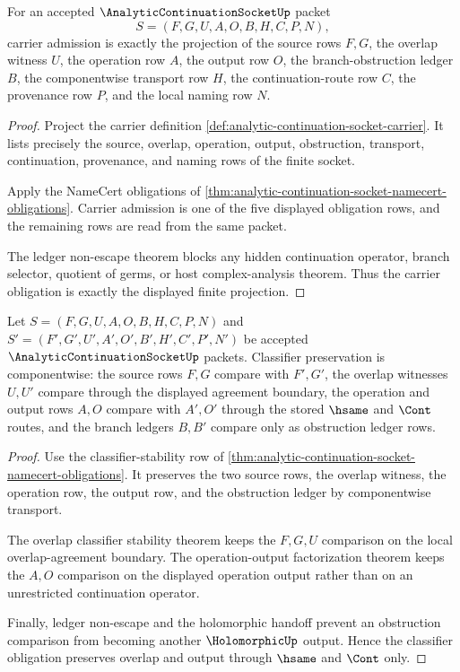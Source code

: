 \begin{theorem}
\label{thm:analytic-continuation-socket-carrier-obligation}
For an accepted $\AnalyticContinuationSocketUp$ packet
$$
S=(F,G,U,A,O,B,H,C,P,N),
$$
carrier admission is exactly the projection of the source rows $F,G$, the overlap witness $U$, the operation row $A$, the output row $O$, the branch-obstruction ledger $B$, the componentwise transport row $H$, the continuation-route row $C$, the provenance row $P$, and the local naming row $N$.
\end{theorem}
\begin{proof}
Project the carrier definition \autoref{def:analytic-continuation-socket-carrier}. It lists precisely the source, overlap, operation, output, obstruction, transport, continuation, provenance, and naming rows of the finite socket.

Apply the NameCert obligations of \autoref{thm:analytic-continuation-socket-namecert-obligations}. Carrier admission is one of the five displayed obligation rows, and the remaining rows are read from the same packet.

The ledger non-escape theorem blocks any hidden continuation operator, branch selector, quotient of germs, or host complex-analysis theorem. Thus the carrier obligation is exactly the displayed finite projection.
\end{proof}

\begin{theorem}
\label{thm:analytic-continuation-socket-classifier-obligation}
Let $S=(F,G,U,A,O,B,H,C,P,N)$ and $S'=(F',G',U',A',O',B',H',C',P',N')$ be accepted $\AnalyticContinuationSocketUp$ packets. Classifier preservation is componentwise: the source rows $F,G$ compare with $F',G'$, the overlap witnesses $U,U'$ compare through the displayed agreement boundary, the operation and output rows $A,O$ compare with $A',O'$ through the stored $\hsame$ and $\Cont$ routes, and the branch ledgers $B,B'$ compare only as obstruction ledger rows.
\end{theorem}
\begin{proof}
Use the classifier-stability row of \autoref{thm:analytic-continuation-socket-namecert-obligations}. It preserves the two source rows, the overlap witness, the operation row, the output row, and the obstruction ledger by componentwise transport.

The overlap classifier stability theorem keeps the $F,G,U$ comparison on the local overlap-agreement boundary. The operation-output factorization theorem keeps the $A,O$ comparison on the displayed operation output rather than on an unrestricted continuation operator.

Finally, ledger non-escape and the holomorphic handoff prevent an obstruction comparison from becoming another $\HolomorphicUp$ output. Hence the classifier obligation preserves overlap and output through $\hsame$ and $\Cont$ only.
\end{proof}

